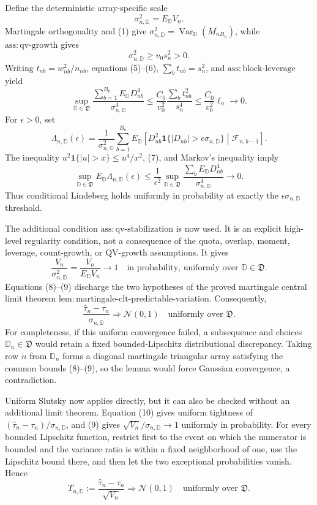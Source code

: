 Define the deterministic array-specific scale
\[
\sigma_{n,\mathbb D}^2=E_{\mathbb D}V_n.
\]
Martingale orthogonality and (1) give \(\sigma_{n,\mathbb D}^2=\operatorname{Var}_{\mathbb D}(M_{nB_n})\), while \(\mathrm{ass:qv\text{-}growth}\) gives
\[
\sigma_{n,\mathbb D}^2\ge v_0s_n^2>0.
\tag{6}
\]
Writing \(t_{nb}=w_{nb}^2/n_{nb}\), equations (5)--(6), \(\sum_bt_{nb}=s_n^2\), and \(\mathrm{ass:block\text{-}leverage}\) yield
\[
\sup_{\mathbb D\in\mathfrak D}
\frac{\sum_{b=1}^{B_n}E_{\mathbb D}D_{nb}^4}{\sigma_{n,\mathbb D}^4}
\le\frac{C_0}{v_0^2}\frac{\sum_bt_{nb}^2}{s_n^4}
\le\frac{C_0}{v_0^2}\ell_n\longrightarrow0.
\tag{7}
\]
For \(\epsilon>0\), set
\[
\Lambda_{n,\mathbb D}(\epsilon)
=\frac1{\sigma_{n,\mathbb D}^2}\sum_{b=1}^{B_n}
E_{\mathbb D}\!\left[D_{nb}^2\mathbf1\{|D_{nb}|>\epsilon\sigma_{n,\mathbb D}\}
\middle|\mathcal F_{n,b-1}\right].
\]
The inequality \(u^2\mathbf1\{|u|>x\}\le u^4/x^2\), (7), and Markov's inequality imply
\[
\sup_{\mathbb D\in\mathfrak D}E_{\mathbb D}\Lambda_{n,\mathbb D}(\epsilon)
\le\frac1{\epsilon^2}
\sup_{\mathbb D\in\mathfrak D}
\frac{\sum_bE_{\mathbb D}D_{nb}^4}{\sigma_{n,\mathbb D}^4}
\longrightarrow0.
\tag{8}
\]
Thus conditional Lindeberg holds uniformly in probability at exactly the \(\epsilon\sigma_{n,\mathbb D}\) threshold.

The additional condition \(\mathrm{ass:qv\text{-}stabilization}\) is now used. It is an explicit high-level regularity condition, not a consequence of the quota, overlap, moment, leverage, count-growth, or QV-growth assumptions. It gives
\[
\frac{V_n}{\sigma_{n,\mathbb D}^2}
=\frac{V_n}{E_{\mathbb D}V_n}\longrightarrow1
\quad\text{in probability, uniformly over }\mathbb D\in\mathfrak D.
\tag{9}
\]
Equations (8)--(9) discharge the two hypotheses of the proved martingale central limit theorem \(\mathrm{lem:martingale\text{-}clt\text{-}predictable\text{-}variation}\). Consequently,
\[
\frac{\widehat\tau_n-\tau_n}{\sigma_{n,\mathbb D}}
\Rightarrow\mathcal N(0,1)
\quad\text{uniformly over }\mathfrak D.
\tag{10}
\]
For completeness, if this uniform convergence failed, a subsequence and choices \(\mathbb D_n\in\mathfrak D\) would retain a fixed bounded-Lipschitz distributional discrepancy. Taking row \(n\) from \(\mathbb D_n\) forms a diagonal martingale triangular array satisfying the common bounds (8)--(9), so the lemma would force Gaussian convergence, a contradiction.

Uniform Slutsky now applies directly, but it can also be checked without an additional limit theorem. Equation (10) gives uniform tightness of \((\widehat\tau_n-\tau_n)/\sigma_{n,\mathbb D}\), and (9) gives \(\sqrt{V_n}/\sigma_{n,\mathbb D}\to1\) uniformly in probability. For every bounded Lipschitz function, restrict first to the event on which the numerator is bounded and the variance ratio is within a fixed neighborhood of one, use the Lipschitz bound there, and then let the two exceptional probabilities vanish. Hence
\[
T_{n,\mathbb D}:=\frac{\widehat\tau_n-\tau_n}{\sqrt{V_n}}
\Rightarrow\mathcal N(0,1)
\quad\text{uniformly over }\mathfrak D.
\tag{11}
\]

